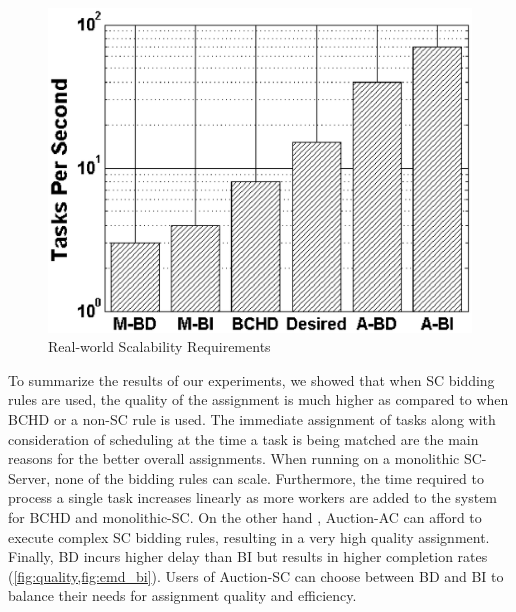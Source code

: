 \begin{figure}[h]
	\centering
	\includegraphics[width = 0.75\columnwidth]{figures/scale_req.eps}
	\vspace{-0.1in}
	\caption{Real-world Scalability Requirements}\label{fig:req}
\end{figure}

To summarize the results of our experiments, we showed that when SC bidding rules are used, the quality of the assignment is much higher as compared to when BCHD or a non-SC rule is used. The immediate assignment of tasks along with consideration of scheduling at the time a task is being matched are the main reasons for the better overall assignments. When running on a monolithic SC-Server, none of the bidding rules can scale. Furthermore, the time required to process a single task increases linearly as more workers are added to the system for BCHD and monolithic-SC. On the other hand , Auction-AC can afford to execute complex SC bidding rules, resulting in a very high quality assignment. Finally, BD incurs higher delay than BI but results in higher completion rates (\cref{fig:quality,fig:emd_bi}). Users of Auction-SC can choose between BD and BI to balance their needs for assignment quality and efficiency.

